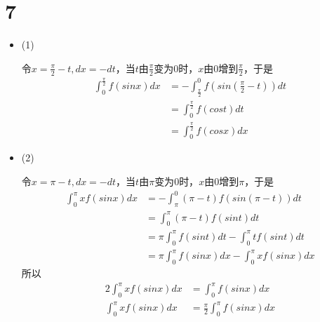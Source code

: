 \documentclass{article}
\begin{document}
\section*{7}

\begin{itemize}
  \item (1)

        令$x = \frac{\pi}{2} - t, dx = -dt$，当$t$由$\frac{\pi}{2}$变为$0$时，$x$由$0$增到$\frac{\pi}{2}$，于是
        \begin{align*}
          \int_{0}^{\frac{\pi}{2}} f(sinx) dx
           & = - \int_{\frac{\pi}{2}}^{0} f(sin (\frac{\pi}{2} - t)) dt \\
           & = \int_{0}^{\frac{\pi}{2}} f(cos t) dt                     \\
           & = \int_{0}^{\frac{\pi}{2}} f(cos x) dx
        \end{align*}

  \item (2)

        令$x = \pi - t, dx = -dt$，当$t$由$\pi$变为$0$时，$x$由$0$增到$\pi$，于是
        \begin{align*}
          \int_{0}^{\pi} x f(sinx) dx
           & = - \int_{\pi}^{0} (\pi - t) f(sin(\pi - t)) dt                \\
           & = \int_{0}^{\pi}  (\pi - t) f(sin t) dt                        \\
           & = \pi \int_{0}^{\pi} f(sin t) dt - \int_{0}^{\pi} tf(sin t) dt \\
           & = \pi \int_{0}^{\pi} f(sin x) dx - \int_{0}^{\pi} xf(sin x) dx
        \end{align*}
        所以
        \begin{align*}
          2 \int_{0}^{\pi} x f(sinx) dx & = \int_{0}^{\pi} f(sin x) dx               \\
          \int_{0}^{\pi} x f(sinx) dx   & = \frac{\pi}{2} \int_{0}^{\pi} f(sin x) dx
        \end{align*}

\end{itemize}
\end{document}

